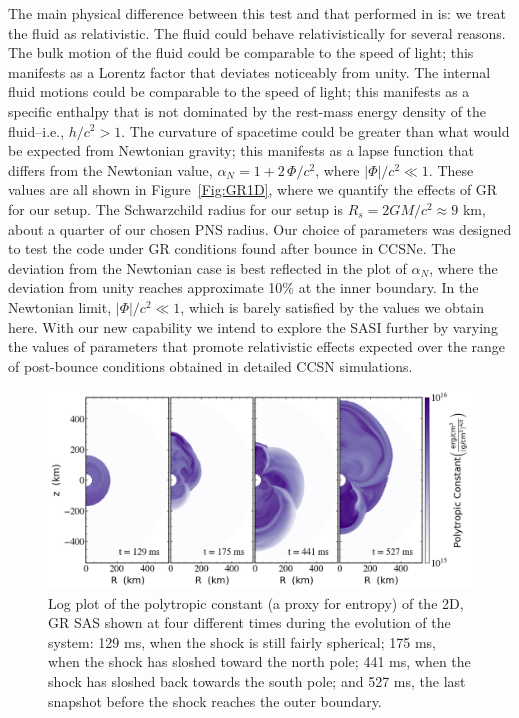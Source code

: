 \documentclass[letterpaper]{jpconf}
\newcommand{\figref}[1]{Figure~\ref{#1}}
\begin{document}
The main physical difference between this test and that performed in \cite{Blondin2003} is: we treat the fluid as relativistic. The fluid could behave relativistically for several reasons. The bulk motion of the fluid could be comparable to the speed of light; this manifests as a Lorentz factor that deviates noticeably from unity. The internal fluid motions could be comparable to the speed of light; this manifests as a specific enthalpy that is not dominated by the rest-mass energy density of the fluid--i.e., $h/c^2>1$. The curvature of spacetime could be greater than what would be expected from Newtonian gravity; this manifests as a lapse function that differs from the Newtonian value, $\alpha_{N}=1+2\,\Phi/c^{2}$, where $\left|\Phi\right|/c^{2}\ll1$. These values are all shown in \figref{Fig:GR1D}, where we quantify the effects of GR for our setup. The Schwarzchild radius for our setup is $R_{s}=2GM/c^{2}\approx9$ km, about a quarter of our chosen PNS radius. Our choice of parameters was designed to test the code under GR conditions found after bounce in CCSNe. The deviation from the Newtonian case is best reflected in the plot of $\alpha_{N}$, where the deviation from unity reaches approximate 10\% at the inner boundary. In the Newtonian limit, $\left|\Phi\right|/c^{2}\ll1$, which is barely satisfied by the values we obtain here. With our new capability we intend to explore the SASI further by varying the values of parameters that promote relativistic effects expected over the range of post-bounce conditions obtained in detailed CCSN simulations.

\begin{figure}
\centering
\includegraphics[width=\textwidth]{Images/SAS2D.png}
\caption{Log plot of the polytropic constant (a proxy for entropy) of the 2D, GR SAS shown at four different times during the evolution of the system: 129 ms, when the shock is still fairly spherical; 175 ms, when the shock has sloshed toward the north pole; 441 ms, when the shock has sloshed back towards the south pole; and 527 ms, the last snapshot before the shock reaches the outer boundary.}
\label{Fig:GR_SASI}
\end{figure}
\end{document}
